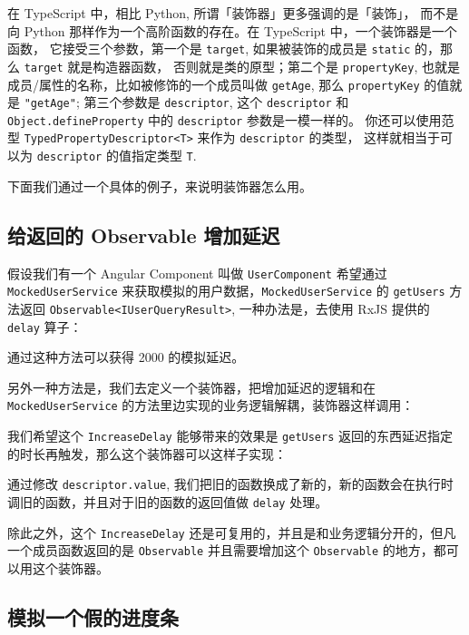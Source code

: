 \documentclass{ctexart}
\begin{document}
    在 TypeScript 中，相比 Python, 所谓「装饰器」更多强调的是「装饰」，
    而不是向 Python 那样作为一个高阶函数的存在。在 TypeScript 中，一个装饰器是一个函数，
    它接受三个参数，第一个是 \verb`target`, 如果被装饰的成员是 \verb`static` 的，那么 \verb`target` 就是构造器函数，
    否则就是类的原型；第二个是 \verb`propertyKey`, 也就是成员/属性的名称，比如被修饰的一个成员叫做 \verb`getAge`, 
    那么 \verb`propertyKey` 的值就是 \verb`"getAge"`; 
    第三个参数是 \verb`descriptor`, 这个 \verb`descriptor` 和 \verb`Object.defineProperty` 中的 \verb`descriptor` 参数是一模一样的。
    你还可以使用范型 \verb`TypedPropertyDescriptor<T>` 来作为 \verb`descriptor` 的类型，
    这样就相当于可以为 \verb`descriptor` 的值指定类型 \verb`T`. 

    下面我们通过一个具体的例子，来说明装饰器怎么用。

    \subsection{给返回的 Observable 增加延迟}

    假设我们有一个 Angular Component 叫做 \verb`UserComponent` 希望通过 \verb`MockedUserService` 来获取模拟的用户数据，\verb`MockedUserService` 的 \verb`getUsers` 方法返回 \verb`Observable<IUserQueryResult>`, 一种办法是，去使用 RxJS 提供的 \verb`delay` 算子：

    
    通过这种方法可以获得 2000 的模拟延迟。

    另外一种方法是，我们去定义一个装饰器，把增加延迟的逻辑和在 \verb`MockedUserService` 的方法里边实现的业务逻辑解耦，装饰器这样调用：

    

    我们希望这个 \verb`IncreaseDelay` 能够带来的效果是 \verb`getUsers` 返回的东西延迟指定的时长再触发，那么这个装饰器可以这样子实现：

    
    通过修改 \verb`descriptor.value`, 我们把旧的函数换成了新的，新的函数会在执行时调旧的函数，并且对于旧的函数的返回值做 \verb`delay` 处理。

    除此之外，这个 \verb`IncreaseDelay` 还是可复用的，并且是和业务逻辑分开的，但凡一个成员函数返回的是 \verb`Observable` 并且需要增加这个 \verb`Observable` 的地方，都可以用这个装饰器。

    \subsection{模拟一个假的进度条}
\end{document}
